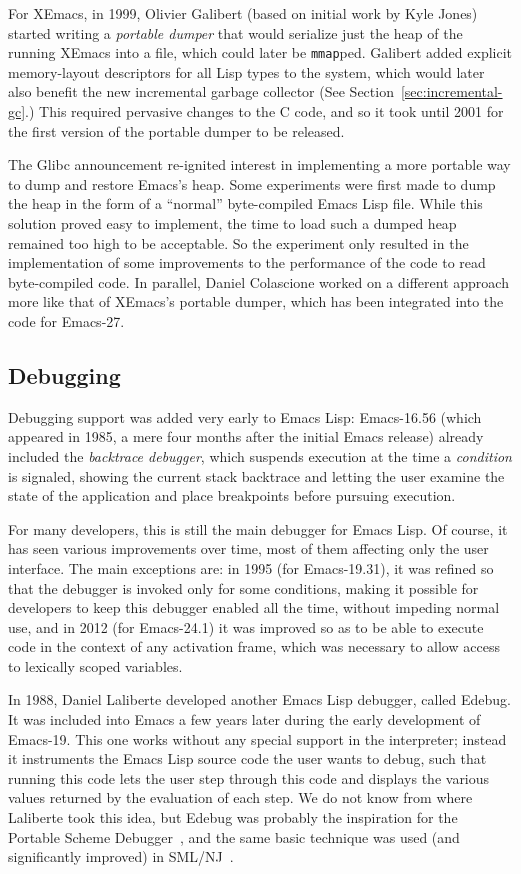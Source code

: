 \documentclass[format=acmsmall, review]{acmart}
\newcommand \Elisp {Emacs Lisp}
\begin{document}
For XEmacs, in 1999, Olivier Galibert (based on initial work by Kyle
Jones) started writing a \emph{portable dumper} that would serialize
just the heap of the running XEmacs into a file, which could later be
\texttt{mmap}ped.  Galibert added explicit memory-layout descriptors
for all Lisp types to the system, which would later also benefit the
new incremental garbage collector (See
Section~\ref{sec:incremental-gc}.)  This required pervasive changes to
the C code, and so it took until 2001 for the first version of the
portable dumper to be released.

The Glibc announcement re-ignited interest in implementing a more portable
way to dump and restore Emacs's heap.  Some experiments were first made to dump
the heap in the form of a ``normal'' byte-compiled \Elisp{} file.
While this solution proved easy to implement, the time to load such a dumped
heap remained too high to be acceptable.  So the experiment only resulted in
the implementation of some improvements to the performance of the code to
read byte-compiled code.  In parallel, Daniel Colascione worked on
a different approach more like that of XEmacs's portable dumper, which has
been integrated into the code for Emacs-27.

\subsection{Debugging}
\label{sec:debugger}

Debugging support was added very early to \Elisp: Emacs-16.56 (which
appeared in 1985, a mere four months after the initial Emacs release) already
included the \emph{backtrace debugger}, which suspends execution at the time
a \emph{condition} is signaled, showing the current stack backtrace and
letting the user examine the state of the application and place breakpoints
before pursuing execution.

For many developers, this is still the main debugger for \Elisp{}.
Of course, it has seen various improvements over time, most of them
affecting only the user interface.  The main exceptions are:
in 1995 (for Emacs-19.31), it was refined so that the debugger is invoked
only for some conditions, making it possible for developers to keep this
debugger enabled all the time, without impeding normal use, and in 2012
(for Emacs-24.1) it was improved so as to be able to execute code in the
context of any activation frame, which was necessary to allow access to
lexically scoped variables.

In 1988, Daniel Laliberte developed another \Elisp{} debugger, called
Edebug.  It was included into Emacs a few years later during the early
development of Emacs-19.  This one works without any special support in the
interpreter; instead it instruments the \Elisp{} source code the user wants to
debug, such that running this code lets the user step through this code and
displays the various values returned by the evaluation of each step.  We do
not know from where Laliberte took this idea, but Edebug was probably the
inspiration for the Portable Scheme Debugger~\cite{Kellomaki93}, and the
same basic technique was used (and significantly improved) in
SML/NJ~\cite{Tolmach90}.
\end{document}

